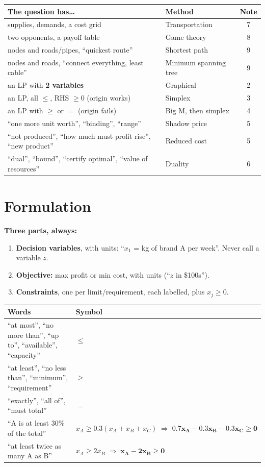 \documentclass[10pt,a4paper]{article}
\newcommand{\thead}[1]{\textbf{#1}}
\newcommand{\Le}{\ensuremath{\leq}}
\newcommand{\Ge}{\ensuremath{\geq}}
\begin{document}
\begin{tabularx}{\linewidth}{@{}LL c@{}}
\toprule
\thead{The question has\ldots} & \thead{Method} & \thead{Note} \\
\midrule
supplies, demands, a cost grid & Transportation & 7 \\
two opponents, a payoff table & Game theory & 8 \\
nodes and roads/pipes, ``quickest route'' & Shortest path & 9 \\
nodes and roads, ``connect everything, least cable'' & Minimum spanning tree & 9 \\
an LP with \textbf{2 variables} & Graphical & 2 \\
an LP, all \Le, RHS $\geq 0$ (origin works) & Simplex & 3 \\
an LP with \Ge{} or $=$ (origin fails) & Big M, then simplex & 4 \\
``one more unit worth'', ``binding'', ``range'' & Shadow price & 5 \\
``not produced'', ``how much must profit rise'', ``new product'' & Reduced cost & 5 \\
``dual'', ``bound'', ``certify optimal'', ``value of resources'' & Duality & 6 \\
\bottomrule
\end{tabularx}

\section{Formulation}

\textbf{Three parts, always:}
\begin{enumerate}
  \item \textbf{Decision variables}, with units: ``$x_1$ = kg of brand A per week''. Never call a variable $z$.
  \item \textbf{Objective:} max profit or min cost, with units (``$z$ in \$100s'').
  \item \textbf{Constraints}, one per limit/requirement, each labelled, plus \textbf{$x_j \geq 0$}.
\end{enumerate}

\begin{tabularx}{\linewidth}{@{}L l@{}}
\toprule
\thead{Words} & \thead{Symbol} \\
\midrule
``at most'', ``no more than'', ``up to'', ``available'', ``capacity'' & \Le \\
``at least'', ``no less than'', ``minimum'', ``requirement'' & \Ge \\
``exactly'', ``all of'', ``must total'' & $=$ \\
``A is at least 30\% of the total'' & $x_A \geq 0.3(x_A+x_B+x_C) \;\Rightarrow\; \mathbf{0.7x_A - 0.3x_B - 0.3x_C \geq 0}$ \\
``at least twice as many A as B'' & $x_A \geq 2x_B \;\Rightarrow\; \mathbf{x_A - 2x_B \geq 0}$ \\
\bottomrule
\end{tabularx}
\end{document}
